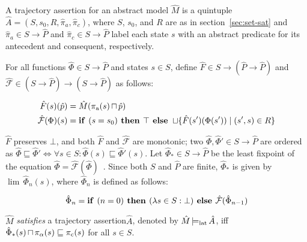 A trajectory assertion for an abstract model $\hat M$ is a quintuple $\hat A = (S, s_{0}, R, \hat{\pi}_{a}, \hat{\pi}_{c})$, where $S$, $s_{0}$, and $R$ are as in section~\ref{sec:set-sat} and $\hat{\pi}_{a} \in S \rightarrow \hat P$ and $\hat{\pi}_{c} \in S \rightarrow \hat P$ label each state $s$ with an abstract predicate for its antecedent and consequent, respectively.

 For all functions $\hat \Phi \in S \rightarrow \hat P$ and states $s \in S$, define $\hat F \in S \rightarrow (\hat P \rightarrow \hat P)$ and $\hat{\mathcal{F}} \in (S \rightarrow \hat P) \rightarrow (S \rightarrow \hat P)$ as follows:

\begin{align}
\hat F(s)(\hat p) &= \hat M(\operatorname{\pi_{\textrm{a}}}(s) \operatorname{\sqcap} \hat p) \\
\hat{\mathcal{F}}(\Phi)(s) &= \textrm{\textbf{if }} (s = s_{0}) \textrm{\textbf{ then }} \top \textrm{\textbf{ else }} \operatorname{\sqcup} \{ \hat F(s')(\Phi(s')) \mid (s',s) \in R \}
\end{align}

\noindent $\hat F$ preserves $\bot$, and both $\hat F$ and $\hat{\mathcal{F}}$ are monotonic; two $\hat \Phi, \hat \Phi' \in S \rightarrow \hat P$ are ordered as $\hat \Phi \sqsubseteq \hat \Phi' \iff \forall s \in S : \hat \Phi(s) \sqsubseteq \hat \Phi'(s)$. Let $\hat \Phi_{*} \in S \rightarrow \hat P$ be the least fixpoint of the equation $\hat \Phi = \hat{\mathcal{F}}(\hat \Phi)$~\cite{davey2002}. Since both $S$ and $\hat P$ are finite, $\hat \Phi_{*}$ is given by $\lim \, \hat \Phi_{n}(s)$, where $\hat \Phi_{n}$ is defined as follows:

\begin{equation}
\hat \Phi_{n} = \textrm{\textbf{if }} (n = 0) \textrm{\textbf{ then }} (\lambda s \in S : \bot) \textrm{\textbf{ else }} \hat{\mathcal{F}}(\hat \Phi_{n-1})
\end{equation}

$\hat M$ \textit{satisfies} a trajectory assertion\footnotemark $\hat A$, denoted by $\hat M \operatorname{\models_{\textrm{lat}}} \hat A$, iff $\hat \Phi_{*}(s) \operatorname{\sqcap} \pi_{\alpha}(s) \sqsubseteq \operatorname{\pi_{\textrm{c}}}(s)$ for all $s \in S$.


